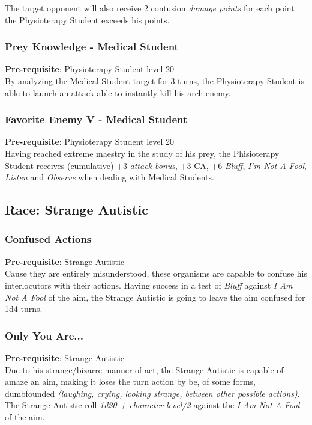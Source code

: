 \documentclass[ letterpaper,12pt]{article}
\begin{document}
The target opponent will also receive 2 contusion {\it damage points} for each point the Physioterapy Student exceeds his points.

\subsubsection{Prey Knowledge - Medical Student}
 {\bf Pre-requisite}: Physioterapy Student level 20\\
 By analyzing the Medical Student target for 3 turns, the Physioterapy Student is able to launch an attack able to instantly kill his arch-enemy.

\subsubsection{Favorite Enemy V - Medical Student}
 {\bf Pre-requisite}: Physioterapy Student level 20\\
 Having reached extreme maestry in the study of his prey, the Phisioterapy Student receives (cumulative) +3 {\it attack bonus}, +3 CA, +6 {\it Bluff}, {\it I'm Not A Fool}, {\it Listen} and {\it Observe} when dealing with Medical Students.

\subsection{Race: Strange Autistic}

\subsubsection{Confused Actions}
{\bf Pre-requisite}: Strange Autistic\\
Cause they are entirely misunderstood, these organisms are capable to confuse his interlocutors with their actions. Having success in a test of {\it Bluff} against {\it I Am Not A Fool} of the aim, the Strange Autistic is going to leave the aim confused for 1d4 turns.

\subsubsection{Only You Are...}
 {\bf Pre-requisite}: Strange Autistic\\
Due to his strange/bizarre manner of act, the Strange Autistic is capable of amaze an aim, making it loses the turn action by be, of some forms, dumbfounded {\it (laughing, crying, looking strange, between other possible actions)}.  The Strange Autistic roll {\it 1d20 + character level/2} against the {\it I Am Not A Fool} of the aim.
\end{document}
